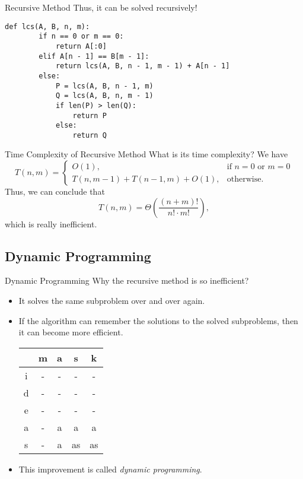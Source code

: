 \documentclass{beamer}
\begin{document}
\begin{frame}[fragile]{Recursive Method}
  Thus, it can be solved recursively! \pause
  \begin{block}{}
    \scriptsize
    \begin{lstlisting}[gobble=4]
    def lcs(A, B, n, m):
        if n == 0 or m == 0:
            return A[:0]
        elif A[n - 1] == B[m - 1]:
            return lcs(A, B, n - 1, m - 1) + A[n - 1]
        else:
            P = lcs(A, B, n - 1, m)
            Q = lcs(A, B, n, m - 1)
            if len(P) > len(Q):
                return P
            else:
                return Q
    \end{lstlisting}
  \end{block}
\end{frame}

\begin{frame}{Time Complexity of Recursive Method}
  What is its time complexity? \pause
  We have
  \begin{equation*}
    T(n, m) =
    \begin{cases}
      O(1), & \text{if $n = 0$ or $m = 0$} \\
      T(n, m - 1) + T(n - 1, m) + O(1), & \text{otherwise}.
    \end{cases}
  \end{equation*}
  \pause
  Thus, we can conclude that
  \begin{equation*}
    T(n, m) = \Theta\left(\frac{(n+m)!}{n! \cdot m!}\right),
  \end{equation*}
  which is really inefficient.
\end{frame}

\subsection{Dynamic Programming}
\begin{frame}{Dynamic Programming}
  Why the recursive method is so inefficient? \pause
  \begin{itemize}
    \item It solves the same subproblem over and over again. \pause
    \item If the algorithm can remember the solutions to the solved
    subproblems, then it can become more efficient.
    \begin{center}
      \ttfamily
      \begin{tabular}{c|cccc}
          & m & a & s & k \\ 
        \hline
        i & - & - & - & - \\
        d & - & - & - & - \\
        e & - & - & - & - \\
        a & - & a & a & a \\
        s & - & a & as & as
      \end{tabular}
    \end{center}
    \pause
    \vspace{.5em}
    \item This improvement is called \emph{dynamic programming}.
  \end{itemize}
\end{frame}
\end{document}
